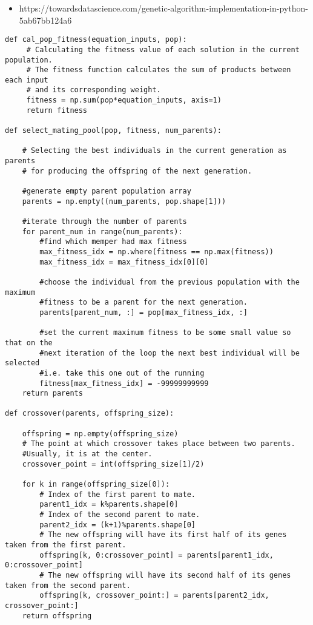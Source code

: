 \documentclass[11pt]{article}
\providecommand{\tightlist}{%
      \setlength{\itemsep}{0pt}\setlength{\parskip}{0pt}}
\begin{document}
\begin{itemize}
\tightlist
\item
  https://towardsdatascience.com/genetic-algorithm-implementation-in-python-5ab67bb124a6
  \cite{gad_genetic_2018}
\end{itemize}
%
\begin{lstlisting}
def cal_pop_fitness(equation_inputs, pop):
     # Calculating the fitness value of each solution in the current population.
     # The fitness function calculates the sum of products between each input
     # and its corresponding weight.
     fitness = np.sum(pop*equation_inputs, axis=1)
     return fitness

def select_mating_pool(pop, fitness, num_parents):

    # Selecting the best individuals in the current generation as parents
    # for producing the offspring of the next generation.

    #generate empty parent population array
    parents = np.empty((num_parents, pop.shape[1]))

    #iterate through the number of parents
    for parent_num in range(num_parents):
        #find which memper had max fitness
        max_fitness_idx = np.where(fitness == np.max(fitness))
        max_fitness_idx = max_fitness_idx[0][0]

        #choose the individual from the previous population with the maximum
        #fitness to be a parent for the next generation.
        parents[parent_num, :] = pop[max_fitness_idx, :]

        #set the current maximum fitness to be some small value so that on the
        #next iteration of the loop the next best individual will be selected
        #i.e. take this one out of the running
        fitness[max_fitness_idx] = -99999999999
    return parents

def crossover(parents, offspring_size):

    offspring = np.empty(offspring_size)
    # The point at which crossover takes place between two parents.
    #Usually, it is at the center.
    crossover_point = int(offspring_size[1]/2)

    for k in range(offspring_size[0]):
        # Index of the first parent to mate.
        parent1_idx = k%parents.shape[0]
        # Index of the second parent to mate.
        parent2_idx = (k+1)%parents.shape[0]
        # The new offspring will have its first half of its genes taken from the first parent.
        offspring[k, 0:crossover_point] = parents[parent1_idx, 0:crossover_point]
        # The new offspring will have its second half of its genes taken from the second parent.
        offspring[k, crossover_point:] = parents[parent2_idx, crossover_point:]
    return offspring


\end{lstlisting}
\end{document}
